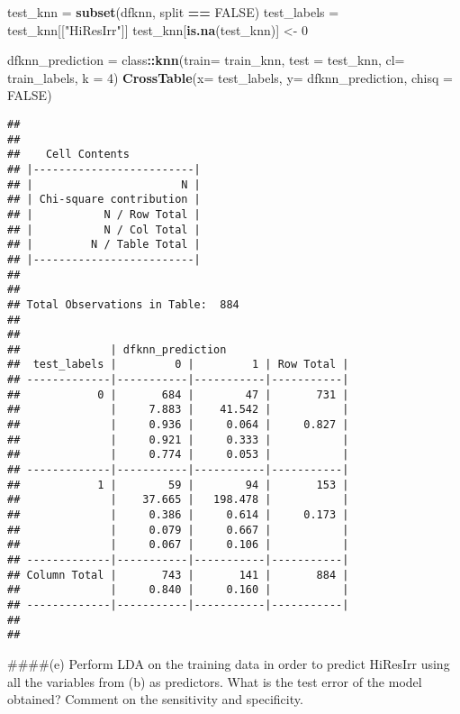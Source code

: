 \documentclass[]{article}
\newenvironment{Shaded}{\begin{snugshade}}{\end{snugshade}}
\newcommand{\DataTypeTok}[1]{\textcolor[rgb]{0.13,0.29,0.53}{#1}}
\newcommand{\DecValTok}[1]{\textcolor[rgb]{0.00,0.00,0.81}{#1}}
\newcommand{\KeywordTok}[1]{\textcolor[rgb]{0.13,0.29,0.53}{\textbf{#1}}}
\newcommand{\NormalTok}[1]{#1}
\newcommand{\OperatorTok}[1]{\textcolor[rgb]{0.81,0.36,0.00}{\textbf{#1}}}
\newcommand{\OtherTok}[1]{\textcolor[rgb]{0.56,0.35,0.01}{#1}}
\newcommand{\StringTok}[1]{\textcolor[rgb]{0.31,0.60,0.02}{#1}}
\begin{document}
\begin{Shaded}
\begin{Highlighting}[]
\NormalTok{test\_knn =}\StringTok{ }\KeywordTok{subset}\NormalTok{(dfknn, split }\OperatorTok{==}\StringTok{ }\OtherTok{FALSE}\NormalTok{)}
\NormalTok{test\_labels =}\StringTok{ }\NormalTok{test\_knn[[}\StringTok{"HiResIrr"}\NormalTok{]]}
\NormalTok{test\_knn[}\KeywordTok{is.na}\NormalTok{(test\_knn)] <{-}}\StringTok{ }\DecValTok{0}


\NormalTok{dfknn\_prediction =}\StringTok{ }\NormalTok{class}\OperatorTok{::}\KeywordTok{knn}\NormalTok{(}\DataTypeTok{train=}\NormalTok{ train\_knn, }\DataTypeTok{test =}\NormalTok{ test\_knn, }\DataTypeTok{cl=}\NormalTok{ train\_labels, }\DataTypeTok{k =} \DecValTok{4}\NormalTok{)}
\KeywordTok{CrossTable}\NormalTok{(}\DataTypeTok{x=}\NormalTok{ test\_labels, }\DataTypeTok{y=}\NormalTok{ dfknn\_prediction, }\DataTypeTok{chisq =} \OtherTok{FALSE}\NormalTok{)}
\end{Highlighting}
\end{Shaded}

\begin{verbatim}
## 
##  
##    Cell Contents
## |-------------------------|
## |                       N |
## | Chi-square contribution |
## |           N / Row Total |
## |           N / Col Total |
## |         N / Table Total |
## |-------------------------|
## 
##  
## Total Observations in Table:  884 
## 
##  
##              | dfknn_prediction 
##  test_labels |         0 |         1 | Row Total | 
## -------------|-----------|-----------|-----------|
##            0 |       684 |        47 |       731 | 
##              |     7.883 |    41.542 |           | 
##              |     0.936 |     0.064 |     0.827 | 
##              |     0.921 |     0.333 |           | 
##              |     0.774 |     0.053 |           | 
## -------------|-----------|-----------|-----------|
##            1 |        59 |        94 |       153 | 
##              |    37.665 |   198.478 |           | 
##              |     0.386 |     0.614 |     0.173 | 
##              |     0.079 |     0.667 |           | 
##              |     0.067 |     0.106 |           | 
## -------------|-----------|-----------|-----------|
## Column Total |       743 |       141 |       884 | 
##              |     0.840 |     0.160 |           | 
## -------------|-----------|-----------|-----------|
## 
## 
\end{verbatim}

\#\#\#\#(e) Perform LDA on the training data in order to predict
HiResIrr using all the variables from (b) as predictors. What is the
test error of the model obtained? Comment on the sensitivity and
specificity.
\end{document}
